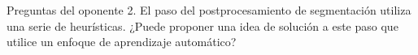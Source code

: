 \documentclass{beamer}
\begin{document}
\begin{frame}[t]{Preguntas del oponente}
    2. El paso del postprocesamiento de segmentación utiliza una serie de heurísticas. 
    ¿Puede proponer una idea de solución a este paso que utilice un enfoque de aprendizaje automático?


    



\end{frame}
\end{document}

